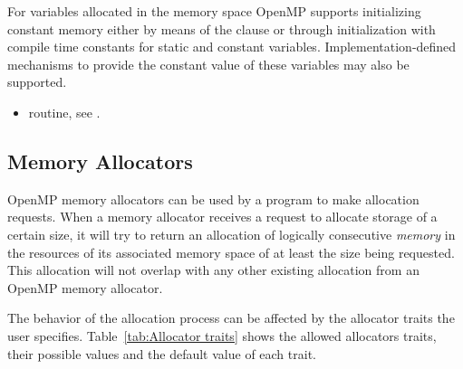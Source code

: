 \linenumbers

\begin{note}
For variables allocated in the  memory space OpenMP 
supports initializing constant memory either by means of the  
clause or through initialization with compile time constants for static and 
constant variables. Implementation-defined mechanisms to provide the constant 
value of these variables may also be supported.
 \end{note}


\crossreferences
\begin{itemize}
\item {} routine, see .
\end{itemize}

\subsection{Memory Allocators}
\label{subsec:Memory Allocators}

OpenMP memory allocators can be used by a program to make allocation requests. 
When a memory allocator receives a request to allocate storage of a certain size, 
it will try to return an allocation of logically consecutive \emph{memory} in 
the resources of its associated memory space of at least the size being requested. 
This allocation will not overlap with any other existing allocation from an OpenMP 
memory allocator. 

The behavior of the allocation process can be affected by the allocator traits 
the user specifies. Table~\ref{tab:Allocator traits} shows the allowed allocators 
traits, their possible values and the default value of each trait.


